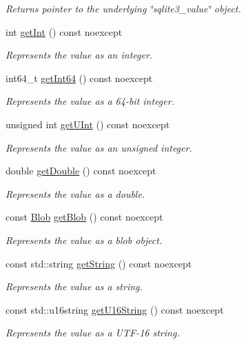 \begin{DoxyCompactItemize}
\begin{DoxyCompactList}\small\item\em Returns pointer to the underlying \char`\"{}sqlite3\-\_\-value\char`\"{} object. \end{DoxyCompactList}\item 
int \hyperlink{a00015_a7dc198b9bcd56e1a00b4277d67e2fe94}{get\-Int} () const noexcept
\begin{DoxyCompactList}\small\item\em Represents the value as an integer. \end{DoxyCompactList}\item 
int64\-\_\-t \hyperlink{a00015_afea7de5c78253675c70f1d4c49740e37}{get\-Int64} () const noexcept
\begin{DoxyCompactList}\small\item\em Represents the value as a 64-\/bit integer. \end{DoxyCompactList}\item 
unsigned int \hyperlink{a00015_a196e4e06082b963730d766f99ccb3917}{get\-U\-Int} () const noexcept
\begin{DoxyCompactList}\small\item\em Represents the value as an unsigned integer. \end{DoxyCompactList}\item 
double \hyperlink{a00015_a7976bd8973e60229f32d57d80b309eef}{get\-Double} () const noexcept
\begin{DoxyCompactList}\small\item\em Represents the value as a double. \end{DoxyCompactList}\item 
const \hyperlink{a00002}{Blob} \hyperlink{a00015_a271c3d7f1de010f03197f5c72fd60d61}{get\-Blob} () const noexcept
\begin{DoxyCompactList}\small\item\em Represents the value as a blob object. \end{DoxyCompactList}\item 
const std\-::string \hyperlink{a00015_ae31b8ba26dec2668d11a49ad895e2267}{get\-String} () const noexcept
\begin{DoxyCompactList}\small\item\em Represents the value as a string. \end{DoxyCompactList}\item 
const std\-::u16string \hyperlink{a00015_a693c71ee6c918f92e4378e91318a7694}{get\-U16\-String} () const noexcept
\begin{DoxyCompactList}\small\item\em Represents the value as a U\-T\-F-\/16 string. \end{DoxyCompactList}\item 

\end{DoxyCompactItemize}
